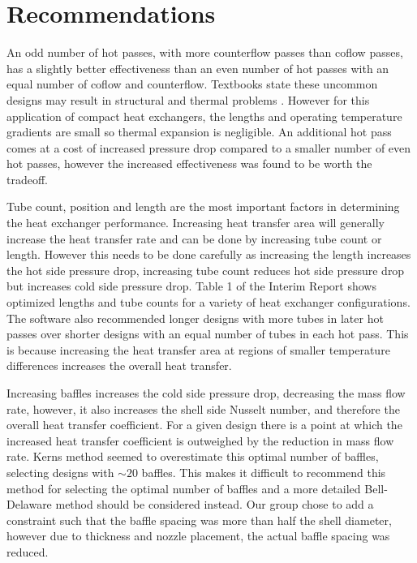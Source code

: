 \documentclass{article}
\begin{document}
\section{Recommendations}
An odd number of hot passes, with more counterflow passes than coflow passes, has a slightly better effectiveness
than an even number of hot passes with an equal number of coflow and counterflow.
Textbooks state these uncommon designs may result in structural and thermal problems \cite{HeatTransfer}.
However for this application of compact heat exchangers, the lengths and operating temperature gradients are small so thermal expansion is negligible.
An additional hot pass comes at a cost of increased pressure drop compared to a smaller number of even hot passes, however the increased effectiveness was found to be worth the tradeoff.

Tube count, position and length are the most important factors in determining the heat exchanger performance.
Increasing heat transfer area will generally increase the heat transfer rate and can be done by increasing tube count or length.
However this needs to be done carefully as increasing the length increases the hot side pressure drop, increasing tube count reduces hot side pressure drop but increases cold side pressure drop.
Table 1 of the Interim Report \cite{InterimReport} shows optimized lengths and tube counts for a variety of heat exchanger configurations.
The software also recommended longer designs with more tubes in later hot passes over shorter designs with an equal number of tubes in each hot pass.
This is because increasing the heat transfer area at regions of smaller temperature differences increases the overall heat transfer.

Increasing baffles increases the cold side pressure drop, decreasing the mass flow rate,
however, it also increases the shell side Nusselt number, and therefore the overall heat transfer coefficient.
For a given design there is a point at which the increased heat transfer coefficient is outweighed by the reduction in mass flow rate.
Kerns method seemed to overestimate this optimal number of baffles, selecting designs with $\sim20$ baffles.
This makes it difficult to recommend this method for selecting the optimal number of baffles and a more detailed Bell-Delaware method should be considered instead.
Our group chose to add a constraint such that the baffle spacing was more than half the shell diameter,
however due to thickness and nozzle placement, the actual baffle spacing was reduced.
\end{document}
